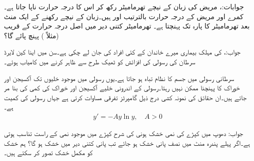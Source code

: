 جوابات:، 
مریض کی زبان کے نیچے تھرمامیٹر رکھ کر اس کا درجہ حرارت ناپا جاتا ہے۔ کمرے اور مریض کے درجہ حرارت بالترتیب  اور  ہیں۔زبان کے نیچے رکھنے کے ایک منٹ بعد تھرمامیٹر کا پارہ  تک پہنچتا ہے۔ تھرمامیٹر کتنی دیر میں اصل درجہ حرارت کے قریب (مثلاً ) پہنچ پائے گا؟

جواب:، 
 کی مہلک بیماری میرے خاندان کے کئی افراد کی جان لے چکی ہے۔سن  میں اینا کین لایرڈ سرطان کی رسولی کی افزائش کو ٹھیک طرح  سے ظاہر کرنے میں کامیاب ہوئے۔

سرطانی رسولی میں جسم کا نظام تباہ ہو جاتا ہے۔یوں رسولی میں موجود خلیوں تک آکسیجن اور خوراک کا پہنچنا ممکن نہیں رہتا۔رسولی کے اندرونی خلیے آکسیجن اور خوراک کی کمی کی بنا مر جاتے ہیں۔ان حقائق کی نمونہ کشی درج ذیل گامپرٹز تفرقی مساوات کرتی ہے جہاں  رسولی کی کمیت ہے۔
\begin{align}
y'=-Ay\ln y,\quad A>0
\end{align}

جواب:
دھوپ میں کپڑے کی نمی خشک ہونی کی شرح کپڑے میں موجود نمی کے راست تناسب ہوتی ہے۔اگر پہلے پندرہ منٹ میں نصف پانی خشک ہو جائے تب   پانی کتنی دیر میں خشک ہو گا؟ ہم   خشک کو مکمل خشک تصور کر سکتے ہیں۔


